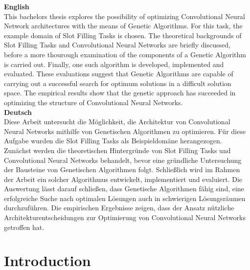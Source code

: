 \documentclass[11pt,a4paper,twoside,openright]{scrbook}
\begin{document}
\deckblatt

\pagestyle{scrheadings}

\erklaerung

\thispagestyle{scrplain}
\noindent
\textbf{English} \\

This bachelors thesis explores the possibility of optimizing Convolutional Neural Network architectures with the means of Genetic Algorithms.
For this task, the example domain of Slot Filling Tasks is chosen.
The theoretical backgrounds of Slot Filling Tasks and Convolutional Neural Networks are briefly discussed, before a more thourough examination of the components of a Genetic Algorithm is carried out.
Finally, one such algorithm is developed, implemented and evaluated. These evaluations suggest that Genetic Algorithms are capable of carrying out a successful search for optimum solutions in a difficult solution space. The empirical results show that the genetic approach has succeeded in optimizing the structure of Convolutional Neural Networks.   \\

\vspace{0.4cm}
\noindent
\textbf{Deutsch} \\

Diese Arbeit untersucht die Möglichkeit, die Architektur von Convolutional Neural Networks mithilfe von Genetischen Algorithmen zu optimieren. Für diese Aufgabe wurden die Slot Filling Tasks als Beispieldomäne herangezogen.
Zunächst werden die theoretischen Hintergründe von Slot Filling Tasks und Convolutional Neural Networks behandelt, bevor eine gründliche Untersuchung der Bausteine von Genetischen Algorithmen folgt. Schließlich wird im Rahmen der Arbeit ein solcher Algorithmus entwickelt, implementiert und evaluiert. Die Auswertung lässt darauf schließen, dass Genetische Algorithmen fähig sind, eine erfolgreiche Suche nach optimalen Lösungen auch in schwierigen Lösungsräumen durchzuführen. Die empirischen Ergebnisse zeigen, dass der Ansatz nützliche Architekturentscheidungen zur Optimierung von Convolutional Neural Networks getroffen hat.


\tableofcontents


\chapter{Introduction}
\end{document}
